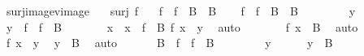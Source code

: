 \begin{isabellebody}
\begin{exercise}[subtitle=Svojstva funkcija]
\begin{isamarkuptext}
\end{isamarkuptext}\isamarkuptrue%
\isamarkupfalse%
\ surj{\isacharunderscore}{\kern0pt}image{\isacharunderscore}{\kern0pt}vimage{\isacharcolon}{\kern0pt}\isanewline
\ \ \ {\isachardoublequoteopen}surj\ f{\isachardoublequoteclose}\isanewline
\ \ \ {\isachardoublequoteopen}f\ {\isacharbackquote}{\kern0pt}\ {\isacharparenleft}{\kern0pt}f\ {\isacharminus}{\kern0pt}{\isacharbackquote}{\kern0pt}\ B{\isacharparenright}{\kern0pt}\ {\isacharequal}{\kern0pt}\ B{\isachardoublequoteclose}\isanewline
%
\isadelimproof
%
\endisadelimproof
%
\isatagproof
{}\isamarkupfalse%
\isanewline
\ \ \isamarkupfalse%
\ {\isachardoublequoteopen}f\ {\isacharbackquote}{\kern0pt}\ f\ {\isacharminus}{\kern0pt}{\isacharbackquote}{\kern0pt}\ B\ {\isasymsubseteq}\ B{\isachardoublequoteclose}\isanewline
\ \ \isamarkupfalse%
\isanewline
\ \ \ \ \isamarkupfalse%
\ y\isanewline
\ \ \ \ \isamarkupfalse%
\ {\isachardoublequoteopen}y\ {\isasymin}\ f\ {\isacharbackquote}{\kern0pt}\ f\ {\isacharminus}{\kern0pt}{\isacharbackquote}{\kern0pt}\ B{\isachardoublequoteclose}\isanewline
\ \ \ \ \isamarkupfalse%
\ \isamarkupfalse%
\ x\ \ {\isachardoublequoteopen}x\ {\isasymin}\ f\ {\isacharminus}{\kern0pt}{\isacharbackquote}{\kern0pt}\ B{\isachardoublequoteclose}\ {\isachardoublequoteopen}f\ x\ {\isacharequal}{\kern0pt}\ y{\isachardoublequoteclose}\ \isamarkupfalse%
\ auto\isanewline
\ \ \ \ \isamarkupfalse%
\ \isamarkupfalse%
\ {\isachardoublequoteopen}f\ x\ {\isasymin}\ B{\isachardoublequoteclose}\ \isamarkupfalse%
\ auto\isanewline
\ \ \ \ \isamarkupfalse%
\ {\isacartoucheopen}f\ x\ {\isacharequal}{\kern0pt}\ y{\isacartoucheclose}\ \isamarkupfalse%
\ {\isachardoublequoteopen}y\ {\isasymin}\ B{\isachardoublequoteclose}\ \isamarkupfalse%
\ auto\isanewline
\ \ \isamarkupfalse%
\isanewline
{}\isamarkupfalse%
\isanewline
\ \ \isamarkupfalse%
\ {\isachardoublequoteopen}B\ {\isasymsubseteq}\ f\ {\isacharbackquote}{\kern0pt}\ f\ {\isacharminus}{\kern0pt}{\isacharbackquote}{\kern0pt}\ B{\isachardoublequoteclose}\isanewline
\ \ \isamarkupfalse%
\isanewline
\ \ \ \ \isamarkupfalse%
\ y\isanewline
\ \ \ \ \isamarkupfalse%
\ {\isachardoublequoteopen}y\ {\isasymin}\ B{\isachardoublequoteclose}\isanewline

\end{exercise}
\end{isabellebody}
